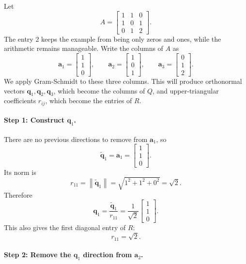 Let
\[
    A=
    \begin{bmatrix}
        1 & 1 & 0\\
        1 & 0 & 1\\
        0 & 1 & 2
    \end{bmatrix}.
\]
The entry \(2\) keeps the example from being only zeros and ones, while the arithmetic remains manageable. Write the columns of \(A\) as
\[
    \mathbf{a}_1=
    \begin{bmatrix}
        1\\1\\0
    \end{bmatrix},
    \qquad
    \mathbf{a}_2=
    \begin{bmatrix}
        1\\0\\1
    \end{bmatrix},
    \qquad
    \mathbf{a}_3=
    \begin{bmatrix}
        0\\1\\2
    \end{bmatrix}.
\]
We apply Gram-Schmidt to these three columns. This will produce orthonormal vectors \(\mathbf{q}_1,\mathbf{q}_2,\mathbf{q}_3\), which become the columns of \(Q\), and upper-triangular coefficients \(r_{ij}\), which become the entries of \(R\).

\paragraph{Step 1: Construct \(\mathbf{q}_1\).}

There are no previous directions to remove from \(\mathbf{a}_1\), so
\[
    \widetilde{\mathbf{q}}_1=\mathbf{a}_1=
    \begin{bmatrix}
        1\\1\\0
    \end{bmatrix}.
\]
Its norm is
\[
    r_{11}
    =\left\|\widetilde{\mathbf{q}}_1\right\|
    =\sqrt{1^2+1^2+0^2}
    =\sqrt{2}.
\]
Therefore
\[
    \mathbf{q}_1
    =\frac{\widetilde{\mathbf{q}}_1}{r_{11}}
    =\frac{1}{\sqrt{2}}
    \begin{bmatrix}
        1\\1\\0
    \end{bmatrix}.
\]
This also gives the first diagonal entry of \(R\):
\[
    r_{11}=\sqrt{2}.
\]

\paragraph{Step 2: Remove the \(\mathbf{q}_1\) direction from \(\mathbf{a}_2\).}

